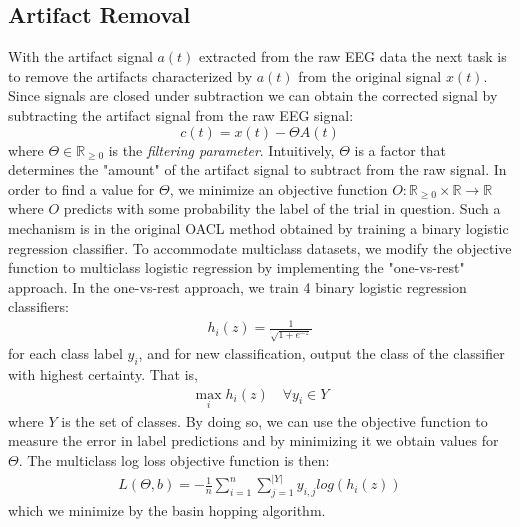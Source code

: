 \subsection{Artifact Removal}
With the artifact signal $a(t)$ extracted from the raw EEG data the next task is to remove the artifacts characterized by $a(t)$ from the original signal $x(t)$. Since signals are closed under subtraction we can obtain the corrected signal by subtracting the artifact signal from the raw EEG signal:
\begin{equation}
\label{eq:correctedsignal}
c(t) = x(t) - \Theta A(t)
\end{equation}
where $\Theta \in \mathbb{R}_{\geq 0}$ is the \emph{filtering parameter}. Intuitively, $\Theta$ is a factor that determines the "amount" of the artifact signal to subtract from the raw signal. 
In order to find a value for $\Theta$, we minimize an objective function $O : \mathbb{R}_{\geq 0} \times \mathbb{R} \rightarrow \mathbb{R}$ where $O$ predicts with some probability the label of the trial in question. Such a mechanism is in the original OACL method obtained by training a binary logistic regression classifier. To accommodate multiclass datasets, we modify the objective function to multiclass logistic regression by implementing the "one-vs-rest" approach. In the one-vs-rest approach, we train 4 binary logistic regression classifiers: 
\begin{align}
h_i(z) = \frac{1}{\sqrt{1+e^{-z}}}
\end{align} for each class label $y_i$, and for new classification, output the class of the classifier with highest certainty. That is,
\begin{align}
\max_{i}h_i(z) \quad \forall y_i \in Y
\end{align}
where $Y$ is the set of classes.
By doing so, we can use the objective function to measure the error in label predictions and by minimizing it we obtain values for $\Theta$. The multiclass log loss objective function is then:
\begin{align}
L(\Theta, b) = -\frac{1}{n}\sum_{i=1}^{n}\sum_{j=1}^{|Y|}y_{i,j} log(h_i(z))
\end{align}
which we minimize by the basin hopping algorithm. 
